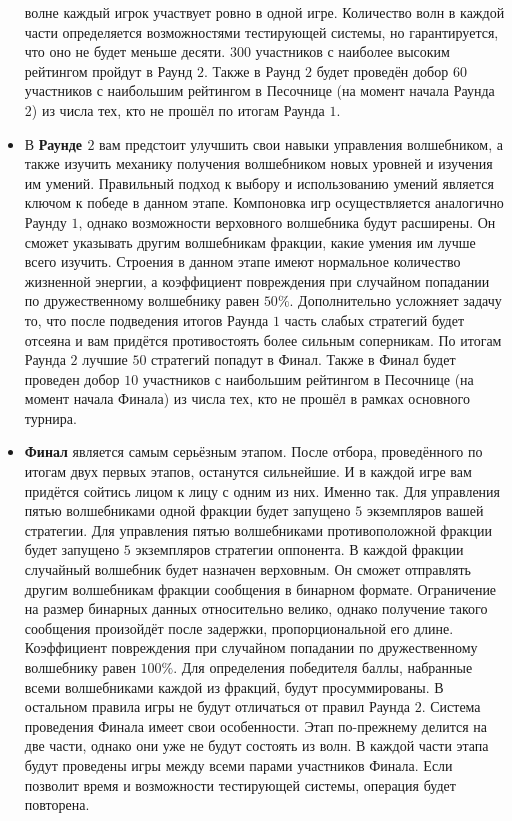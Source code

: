 \begin{itemize}
        волне каждый игрок участвует ровно в одной игре. Количество волн в каждой части определяется возможностями тестирующей системы, но
        гарантируется, что оно не будет меньше десяти. $300$ участников с наиболее высоким рейтингом пройдут в Раунд $2$. Также в Раунд $2$
        будет проведён добор $60$ участников с наибольшим рейтингом в Песочнице (на момент начала Раунда $2$) из числа тех, кто не прошёл по
        итогам Раунда $1$.
  \item В \textbf{Раунде $2$} вам предстоит улучшить свои навыки управления волшебником, а также изучить механику получения волшебником
        новых уровней и изучения им умений. Правильный подход к выбору и использованию умений является ключом к победе в данном этапе.
        Компоновка игр осуществляется аналогично Раунду $1$, однако возможности верховного волшебника будут расширены. Он сможет указывать
        другим волшебникам фракции, какие умения им лучше всего изучить. Строения в данном этапе имеют нормальное количество жизненной
        энергии, а коэффициент повреждения при случайном попадании по дружественному волшебнику равен $50\%$. Дополнительно усложняет задачу
        то, что после подведения итогов Раунда $1$ часть слабых стратегий будет отсеяна и вам придётся противостоять более сильным
        соперникам. По итогам Раунда $2$ лучшие $50$ стратегий попадут в Финал. Также в Финал будет проведен добор $10$ участников с
        наибольшим рейтингом в Песочнице (на момент начала Финала) из числа тех, кто не прошёл в рамках основного турнира.
  \item \textbf{Финал} является самым серьёзным этапом. После отбора, проведённого по итогам двух первых этапов, останутся сильнейшие. И в
        каждой игре вам придётся сойтись лицом к лицу с одним из них. Именно так. Для управления пятью волшебниками одной фракции будет
        запущено $5$ экземпляров вашей стратегии. Для управления пятью волшебниками противоположной фракции будет запущено $5$ экземпляров
        стратегии оппонента. В каждой фракции случайный волшебник будет назначен верховным. Он сможет отправлять другим волшебникам фракции
        сообщения в бинарном формате. Ограничение на размер бинарных данных относительно велико, однако получение такого сообщения
        произойдёт после задержки, пропорциональной его длине. Коэффициент повреждения при случайном попадании по дружественному волшебнику
        равен $100\%$. Для определения победителя баллы, набранные всеми волшебниками каждой из фракций, будут просуммированы. В остальном
        правила игры не будут отличаться от правил Раунда $2$. Система проведения Финала имеет свои особенности. Этап по-прежнему делится на
        две части, однако они уже не будут состоять из волн. В каждой части этапа будут проведены игры между всеми парами участников Финала.
        Если позволит время и возможности тестирующей системы, операция будет повторена.
\end{itemize}

